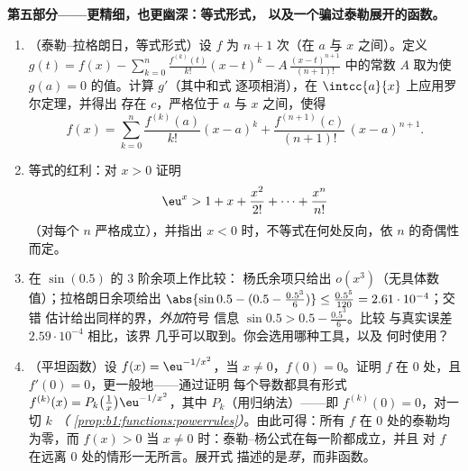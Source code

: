 \begin{problem}
\medskip
\noindent\textbf{第五部分——更精细，也更幽深：等式形式，
以及一个骗过泰勒展开的函数。}
\begin{enumerate}[resume]
  \item （泰勒–拉格朗日，等式形式）设 $f$ 为 $n + 1$
        次（在 $a$ 与 $x$ 之间）。定义 $g(t) =
        f(x) - \sum_{k=0}^{n} \frac{f^{(k)}(t)}{k!}(x - t)^k -
        A\,\frac{(x-t)^{n+1}}{(n+1)!}$ 中的常数 $A$
        取为使 $g(a) = 0$ 的值。计算 $g'$（其中和式
        逐项相消），在 $\intcc{a}{x}$ 上应用罗尔定理，并得出
        存在 $c$，严格位于 $a$ 与 $x$ 之间，使得
        \[
        f(x) = \sum_{k=0}^{n} \frac{f^{(k)}(a)}{k!}(x-a)^k
        + \frac{f^{(n+1)}(c)}{(n+1)!}\,(x-a)^{n+1} .
        \]
  \item 等式的红利：对 $x > 0$ 证明
        \[
        \eu^x > 1 + x + \frac{x^2}{2!} + \dots +
        \frac{x^n}{n!}
        \]
        （对每个 $n$ 严格成立），并指出
        $x < 0$ 时，不等式在何处反向，依
        $n$ 的奇偶性而定。
  \item 在 $\sin(0.5)$ 的 $3$ 阶余项上作比较：
        杨氏余项只给出 $o(x^3)$（无具体数值）；拉格朗日余项给出
        $\abs{\sin 0.5 - (0.5 - \frac{0.5^3}{6})} \leq
        \frac{0.5^5}{120} = 2.61\cdot10^{-4}$；交错
        估计给出同样的界，\emph{外加}符号
        信息 $\sin 0.5 > 0.5 - \frac{0.5^3}{6}$。比较
        与真实误差 $2.59\cdot10^{-4}$ 相比，该界
        几乎可以取到。你会选用哪种工具，以及
        何时使用？
  \item （平坦函数）设 $f(x) = \eu^{-1/x^2}$，当 $x
        \neq 0$，$f(0) = 0$。证明 $f$ 在 $0$ 处，且
        $f'(0) = 0$，更一般地——通过证明
        每个导数都具有形式 $f^{(k)}(x) =
        P_k\bigl(\frac1x\bigr)\eu^{-1/x^2}$，其中
        $P_k$（用归纳法）——即 $f^{(k)}(0) = 0$，对一切 $k$
        \emph{（
        \cref{prop:b1:functions:powerrules}）}。由此可得：所有
        $f$ 在 $0$ 处的泰勒均为零，而 $f(x) > 0$
        当 $x \neq 0$ 时：泰勒–杨公式在每一阶都成立，并且
        对 $f$ 在远离 $0$ 处的情形一无所言。展开式
        描述的是\emph{芽}，而非函数。
\end{enumerate}


\end{problem}
